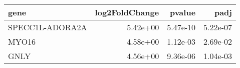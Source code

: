 \begin{tabular}{lrrr}
\toprule
           gene &  log2FoldChange &   pvalue &     padj \\
\midrule
SPECC1L-ADORA2A &        5.42e+00 & 5.47e-10 & 5.22e-07 \\
          MYO16 &        4.58e+00 & 1.12e-03 & 2.69e-02 \\
           GNLY &        4.56e+00 & 9.36e-06 & 1.04e-03 \\
\bottomrule
\end{tabular}
